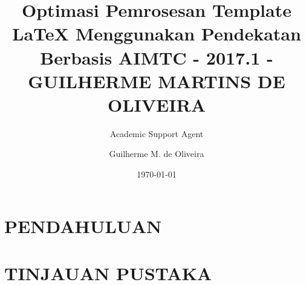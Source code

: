 \documentclass{article}
\title{Optimasi Pemrosesan Template LaTeX Menggunakan Pendekatan Berbasis AI}
\author{Academic Support Agent}
\date{\today}
\begin{document}
\maketitle

\begin{abstract}

\end{abstract}

\chapter{PENDAHULUAN}


\chapter{TINJAUAN PUSTAKA}



\usepackage{sbc-template}

\usepackage{graphicx,url}
 
\usepackage[utf8]{inputenc}  
     
\sloppy

\title{MTC - 2017.1 - GUILHERME MARTINS DE OLIVEIRA }

\author{Guilherme M. de Oliveira }

\address{Bacharelado em Ciência da Computação\\
Instituto Federal de Educação, Ciência e Tecnologia do Ceará (IFCE)\\
   Ceará -- CE -- Brasil
}
\end{document}
